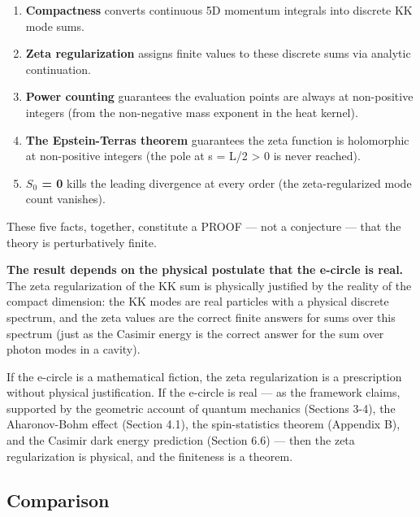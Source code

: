 \documentclass[aps,prd,preprint,superscriptaddress,longbibliography,floatfix]{revtex4-2}
\theoremstyle{remark}
\begin{document}
\begin{enumerate}
  \item \textbf{Compactness} converts continuous 5D momentum integrals into discrete KK mode sums.
  \item \textbf{Zeta regularization} assigns finite values to these discrete sums via analytic continuation.
  \item \textbf{Power counting} guarantees the evaluation points are always at non-positive integers (from the non-negative mass exponent in the heat kernel).
  \item \textbf{The Epstein-Terras theorem} guarantees the zeta function is holomorphic at non-positive integers (the pole at s = L/2 > 0 is never reached).
  \item \textbf{$S_{0}$ = 0} kills the leading divergence at every order (the zeta-regularized mode count vanishes).
\end{enumerate}

These five facts, together, constitute a PROOF --- not a conjecture --- that the theory is perturbatively finite.

\textbf{The result depends on the physical postulate that the e-circle is real.} The zeta regularization of the KK sum is physically justified by the reality of the compact dimension: the KK modes are real particles with a physical discrete spectrum, and the zeta values are the correct finite answers for sums over this spectrum (just as the Casimir energy is the correct answer for the sum over photon modes in a cavity).

If the e-circle is a mathematical fiction, the zeta regularization is a prescription without physical justification. If the e-circle is real --- as the framework claims, supported by the geometric account of quantum mechanics (Sections 3-4), the Aharonov-Bohm effect (Section 4.1), the spin-statistics theorem (Appendix B), and the Casimir dark energy prediction (Section 6.6) --- then the zeta regularization is physical, and the finiteness is a theorem.



\subsection{Comparison}
\end{document}
